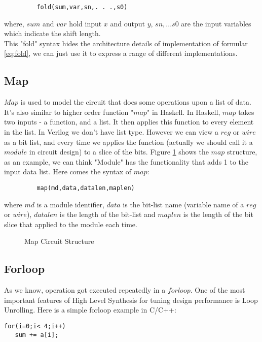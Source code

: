 \begin{verbatim}
         fold(sum,var,sn,. . .,s0)
\end{verbatim}
where, $sum$ and  $var$ hold input $x$ and output $y$, $sn,...s0$ are the input variables which indicate the shift length.
\\
This "fold" syntax hides the architecture details of implementation of formular \eqref{eq:fold}, we can just use it to express a range of different implementations.
\subsection{Map}
$Map$ is used to model the circuit that does some operations upon a list of data. It's also similar to higher order function "$map$" in Haskell. In Haskell, $map$ takes two inputs - a function, and a list. It then applies this function to every element in the list. In Verilog we don't have list type. However we can view a $reg$ or $wire$ as a bit list, and every time we applies the function (actually we should call it a $module$ in circuit design) to a slice of the bits. Figure \ref{fig-map} shows the $map$ structure, as an example, we can think  "Module" has the functionality that adds 1 to the input data list. Here comes the syntax of $map$:

\begin{verbatim}
         map(md,data,datalen,maplen)
\end{verbatim}
where $md$ is a module identifier, $data$ is the bit-list name (variable name of a $reg$ or $wire$), $datalen$ is the length of the bit-list and $maplen$ is the length of the bit slice that applied to the module each time.
\begin{figure}[ht]
\centering
{}
\caption{Map Circuit Structure}
\label{fig-map}
\end{figure}

\subsection{Forloop}
As we know, operation got executed repeatedly in a $forloop$.
One of the most important features of High Level Synthesis\cite{Tutorial:HLS} for tuning design performance is Loop Unrolling\cite{Verilog:Loop}. Here is a simple forloop example in C/C++:
\begin{verbatim}
for(i=0;i< 4;i++)
   sum += a[i];
\end{verbatim}

